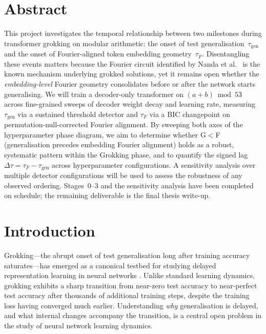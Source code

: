 \documentclass[12pt,openany,oneside,a4paper]{book}
\newcommand{\taug}{\tau_{\mathrm{gen}}}
\newcommand{\tauf}{\tau_{F}}
\newcommand{\Dtau}{\Delta\tau}
\begin{document}
\chapter{Abstract}

This project investigates the temporal relationship between two
milestones during transformer grokking on modular arithmetic:
the onset of test generalisation~$\taug$ and the onset of
Fourier-aligned token embedding geometry~$\tauf$.
Disentangling these events matters because the Fourier circuit
identified by Nanda et al.\ \cite{nanda2023progress} is the known
mechanism underlying grokked solutions, yet it remains open whether
the \emph{embedding-level}
Fourier geometry consolidates before or after the network starts
generalising.
We will train a decoder-only transformer on $(a+b)\bmod 53$ across
fine-grained sweeps of decoder weight decay and learning rate,
measuring $\taug$ via a sustained threshold detector and $\tauf$ via a
BIC changepoint on permutation-null-corrected Fourier alignment.
By sweeping both axes of the hyperparameter phase diagram, we aim to
determine whether G$<$F (generalisation precedes embedding Fourier
alignment) holds as a robust, systematic pattern within the Grokking
phase, and to quantify the signed lag $\Dtau = \tauf - \taug$ across
hyperparameter configurations.
A sensitivity analysis over multiple detector configurations will be
used to assess the robustness of any observed ordering.
Stages~0--3 and the sensitivity analysis have been completed on
schedule; the remaining deliverable is the final thesis write-up.

\tableofcontents

\listoffigures
{}

\listoftables
{}

\cleardoublepage
\mainmatter

\chapter{Introduction}

Grokking---the abrupt onset of test generalisation long after training
accuracy saturates---has emerged as a canonical testbed for studying
delayed representation learning in neural networks
\cite{power2022grokking}.
Unlike standard learning dynamics, grokking exhibits a sharp transition
from near-zero test accuracy to near-perfect test accuracy after
thousands of additional training steps, despite the training loss
having converged much earlier.
Understanding \emph{why} generalisation is delayed, and what internal
changes accompany the transition, is a central open problem in the
study of neural network learning dynamics.
\end{document}
